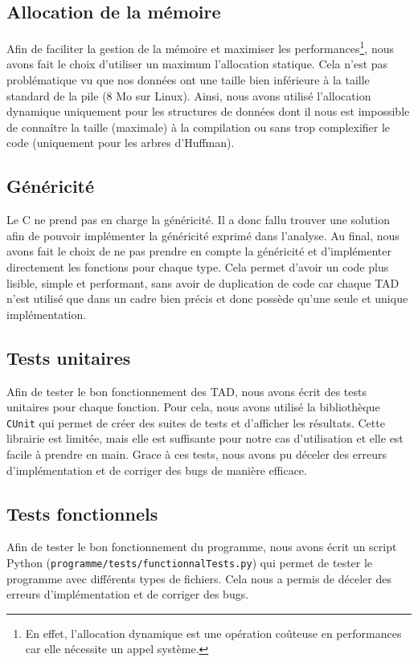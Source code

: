 \subsection{Allocation de la mémoire}

Afin de faciliter la gestion de la mémoire et maximiser les performances\footnote{En effet, l'allocation dynamique est une opération coûteuse en performances car elle nécessite un appel système.},
nous avons fait le choix d'utiliser un maximum l'allocation statique.
Cela n'est pas problématique vu que nos données ont une taille bien inférieure à la taille standard de la pile (8 Mo sur Linux).
Ainsi, nous avons utilisé l'allocation dynamique uniquement pour les structures de données dont il nous est impossible de connaître la taille (maximale) à la compilation ou sans trop complexifier le code
(uniquement pour les arbres d'Huffman).

\subsection{Généricité}

Le C ne prend pas en charge la généricité. Il a donc fallu trouver une solution afin de pouvoir implémenter la généricité exprimé dans l'analyse.
Au final, nous avons fait le choix de ne pas prendre en compte la généricité et d'implémenter directement les fonctions pour chaque type.
Cela permet d'avoir un code plus lisible, simple et performant, sans avoir de duplication de code car chaque TAD n'est utilisé que dans un cadre bien précis et donc possède qu'une seule et unique implémentation.

\subsection{Tests unitaires}

Afin de tester le bon fonctionnement des TAD, nous avons écrit des tests unitaires pour chaque fonction.
Pour cela, nous avons utilisé la bibliothèque \texttt{CUnit} qui permet de créer des suites de tests et d'afficher les résultats.
Cette librairie est limitée, mais elle est suffisante pour notre cas d'utilisation et elle est facile à prendre en main.
Grace à ces tests, nous avons pu déceler des erreurs d'implémentation et de corriger des bugs de manière efficace.

\subsection{Tests fonctionnels}

Afin de tester le bon fonctionnement du programme, nous avons écrit un script Python (\texttt{programme/tests/functionnalTests.py}) qui permet de tester le programme avec différents types de fichiers.
Cela nous a permis de déceler des erreurs d'implémentation et de corriger des bugs.